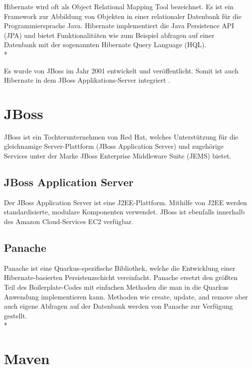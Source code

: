 Hibernate wird oft als Object Relational Mapping Tool bezeichnet. Es ist ein Framework zur Abbildung von Objekten in einer relationaler Datenbank für die Programmiersprache Java.
Hibernate implementiert die Java Persistence API (JPA) und bietet Funktionalitäten wie zum Beispiel abfragen auf einer Datenbank mit der sogenannten Hibernate Query Language (HQL). \\*

Es wurde von JBoss im Jahr 2001 entwickelt und veröffentlicht. Somit ist auch Hibernate in dem JBoss Applikations-Server integriert .\cite{Hibernate}

\section{JBoss}
\author{David Ignjatovic}

JBoss ist ein Tochterunternehmen von Red Hat, welches Unterstützung für die gleichnamige Server-Plattform (JBoss Application Server) 
und zugehörige Services unter der Marke JBoss Enterprise Middleware Suite (JEMS) bietet. \cite{JBoss}

\subsection{JBoss Application Server}

Der JBoss Application Server ist eine J2EE-Plattform. Mithilfe von J2EE werden standardisierte, modulare Komponenten verwendet.
JBoss ist ebenfalls innerhalb des Amazon Cloud-Services EC2 verfügbar. \cite{JBoss}

\subsection{Panache}
\author{David Ignjatovic}

Panache ist eine Quarkus-spezifische Bibliothek, welche die Entwicklung einer Hibernate-basierten Persistenzschicht vereinfacht. 
Panache ersetzt den größten Teil des Boilerplate-Codes mit einfachen Methoden die man in die Quarkus Anwendung implementieren kann. 
Methoden wie create, update, and remove aber auch eigene Abfragen auf der Datenbank werden von Panache zur Verfügung gestellt. \\* \cite{Panache}

\pagebreak

\section{Maven}
\author{David Ignjatovic}

